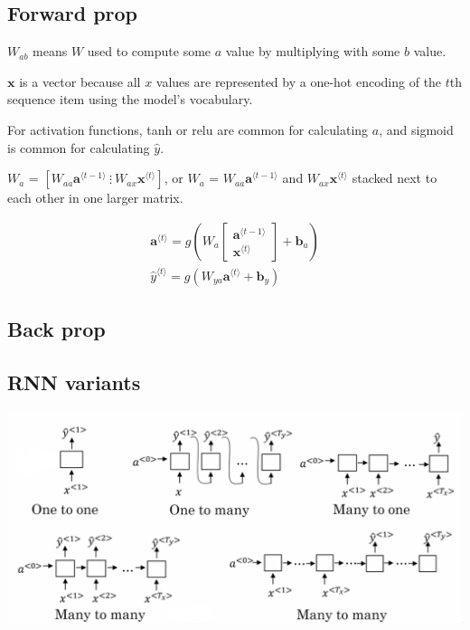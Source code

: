 \documentclass[12pt]{article}
\begin{document}
\subsection{Forward prop}

$W_{ab}$ means $W$ used to compute some $a$ value by multiplying with some $b$ value.

$\bm x$ is a vector because all $x$ values are represented by a one-hot encoding of the $t$th
sequence item using the model's vocabulary.

For activation functions, tanh or relu are common for calculating $a$, and sigmoid is common
for calculating $\hat y$.

$W_a$ = $\left[ W_{aa} \bm a^{\langle t-1 \rangle} \ \vdots \ W_{ax} \bm x^{\langle t \rangle} \right]$, or
$W_a$ = $W_{aa} \bm a^{\langle t-1 \rangle}$ and $W_{ax} \bm x^{\langle t \rangle}$ stacked next to
each other in one larger matrix.

\begin{gather*}
    \bm a^{\langle t \rangle} = g(W_a\begin{bmatrix}\bm a^{\langle t-1 \rangle}\\\bm x^{\langle t \rangle}\end{bmatrix}
        + \bm b_a)\\
    \hat y^{\langle t \rangle} = g(W_{ya} \bm a^{\langle t \rangle} + \bm b_y)
\end{gather*}

\subsection{Back prop}

\subsection{RNN variants}

\includegraphics[scale=1.5]{images/rnn-variants.png}
\end{document}

